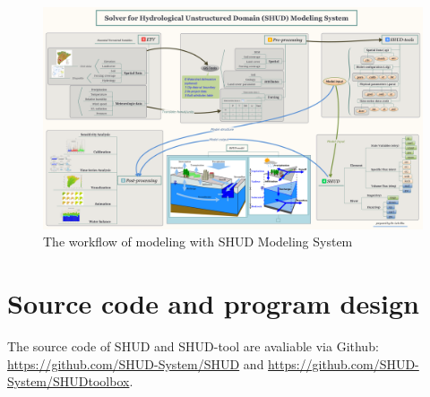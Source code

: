 \documentclass[
]{scrbook}
\begin{document}
\begin{figure}
\centering
\includegraphics{./Fig/autoSHUD.png}
\caption{The workflow of modeling with SHUD Modeling System}
\end{figure}

\hypertarget{source-code-and-program-design}{%
\chapter{Source code and program design}\label{source-code-and-program-design}}

The source code of SHUD and SHUD-tool are avaliable via Github: \url{https://github.com/SHUD-System/SHUD} and \url{https://github.com/SHUD-System/SHUDtoolbox}.

\backmatter
  
\end{document}
